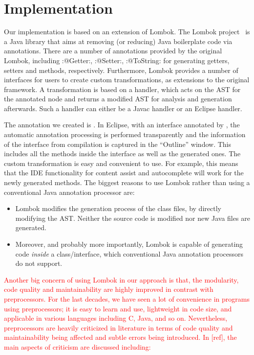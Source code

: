 \section{Implementation}

Our implementation is based on an extension of Lombok. The Lombok
project~\cite{lombok} is a Java library that aims at removing (or
reducing) Java boilerplate code via
annotations. There are a number of annotations provided by the
original Lombok, including \Q:@Getter:, \Q:@Setter:,
\Q:@ToString: for generating getters, setters and 
methods, respectively.  Furthermore, Lombok provides a number of
interfaces for users to create custom transformations, as extensions
to the original framework.
A transformation is based on a handler, which acts on the AST for the
annotated node and returns a modified AST for analysis and
generation afterwards. Such a handler can either be a Javac handler or
an Eclipse handler.

The annotation we created is \mixin. In Eclipse, with an interface annotated by
\mixin, the automatic annotation processing is performed transparently and the information of
the interface from compilation is captured in the ``Outline'' window. This includes
all the methods inside the interface as well as the generated ones.  The custom
transformation is easy and convenient to use.  For example, this means that the
IDE functionality for content assist and autocomplete will work for the newly generated
methods. The biggest reasons to use Lombok rather than using a conventional Java
 annotation processor are:
\begin{itemize}
\item Lombok modifies the generation process of the class files, by directly modifying the AST.
Neither the source code is modified nor new Java files are generated.
\item Moreover, and probably more importantly, Lombok is capable of generating
  code \emph{inside} a class/interface, which conventional
  Java annotation processors do not support.
\end{itemize}

\noindent \textcolor{red}{Another big concern of using Lombok in our approach is that, the modularity, code quality and maintainability
are highly improved in contrast with preprocessors. For the last decades, we have seen a lot of convenience in
programs using preprocessors; it is easy to learn and use, lightweight in code size, and applicable in various
languages including C, Java, and so on. Nevertheless, preprocessors are heavily criticized in literature in
terms of code quality and maintainability being affected and subtle errors being introduced. In [ref], the main
aspects of criticism are discussed including:}

